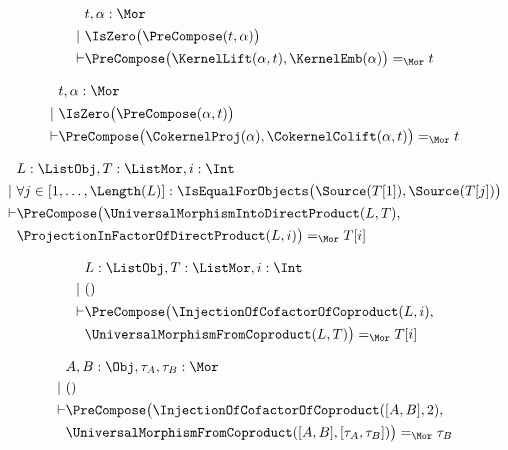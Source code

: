 \begin{sequent}
\begin{align*}
  &t, \alpha:\Mor\\
  |~ &\IsZero\big( \PreCompose( t, \alpha ) \big)\\
  \vdash &\PreCompose\big(\KernelLift( \alpha , t ), \KernelEmb( \alpha ) \big) =_{\Mor} t
\end{align*}
\end{sequent}

\begin{sequent}
\begin{align*}
  &t, \alpha:\Mor\\
  |~  &\IsZero\big(\PreCompose(\alpha, t)\big)\\
  \vdash &\PreCompose\big(\CokernelProj( \alpha ), \CokernelColift( \alpha, t )\big) =_{\Mor} t
\end{align*}
\end{sequent}

\begin{sequent}
\begin{align*}
  &L:\ListObj, T:\ListMor, i:\Int\\
  | ~& \forall j \in [ 1, \dots, \Length( L ) ]: \IsEqualForObjects\big(\Source( T[1] ), \Source( T[j] ) \big) \\
  \vdash &\PreCompose\big(\UniversalMorphismIntoDirectProduct( L, T ), \\
  &\ProjectionInFactorOfDirectProduct( L, i ) \big) =_{\Mor} T[i]
\end{align*}
\end{sequent}

\begin{sequent}
\begin{align*}
  &L:\ListObj, T:\ListMor, i:\Int\\
  |~ &()\\
  \vdash &\PreCompose\big(\InjectionOfCofactorOfCoproduct( L, i ),\\
  &\UniversalMorphismFromCoproduct( L, T ) \big) =_{\Mor} T[i]
\end{align*}
\end{sequent}

\begin{sequent}
\begin{align*}
  &A, B:\Obj, \tau_A, \tau_B:\Mor \\
  |~ &()\\
  \vdash &\PreCompose\big(\InjectionOfCofactorOfCoproduct( [A, B], 2 ),\\
  &\UniversalMorphismFromCoproduct( [A,B], [\tau_A, \tau_B] ) \big) =_{\Mor} \tau_B 
\end{align*}
\end{sequent}


